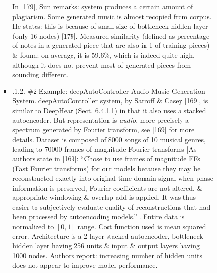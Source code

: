 \documentclass{article}
\begin{document}
\begin{itemize}
\begin{itemize}
\begin{itemize}
\begin{itemize}
				In [179], {\sc Sun} remarks: system produces a certain amount of plagiarism. Some generated music is almost recopied from corpus. He states: this is because of small size of bottleneck hidden layer (only 16 nodes) [179]. Measured similarity (defined as percentage of notes in a generated piece that are also in 1 of training pieces) \& found: on average, it is 59.6\%, which is indeed quite high, although it does not prevent most of generated pieces from sounding different.
				\item {.1.2. \#2 Example: deepAutoController Audio Music Generation System.} deepAutoController system, by {\sc Sarroff \& Casey} [169], is similar to DeepHear (Sect. 6.4.1.1) in that it also uses a stacked autoencoder. But representation is {\it audio}, more precisely a spectrum generated by Fourier transform, see [169] for more details. Dataset is composed of 8000 songs of 10 musical genres, leading to 70000 frames of magnitude Fourier transforms [As authors state in [169]: ``Chose to use frames of magnitude FFs (Fast Fourier transforms) for our models because they may be reconstructed exactly into original time domain signal when phase information is preserved, Fourier coefficients are not altered, \& appropriate windowing \& overlap-add is applied. It was thus easier to subjectively evaluate quality of reconstructions that had been processed by autoencoding models.'']. Entire data is normalized to $[0,1]$ range. Cost function used is mean squared error. Architecture is a 2-layer stacked autoencoder, bottleneck hidden layer having 256 units \& input \& output layers having 1000 nodes. Authors report: increasing number of hidden units does not appear to improve model performance.


\end{itemize}
\end{itemize}
\end{itemize}
\end{itemize}
\end{document}
